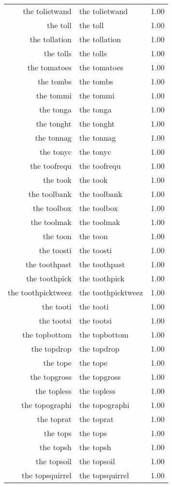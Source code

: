 \begin{table}[ht]
\begin{tabular}{rlr}
  the tolietwand & the tolietwand & 1.00 \\ 
  the toll & the toll & 1.00 \\ 
  the tollation & the tollation & 1.00 \\ 
  the tolls & the tolls & 1.00 \\ 
  the tomatoes & the tomatoes & 1.00 \\ 
  the tombs & the tombs & 1.00 \\ 
  the tommi & the tommi & 1.00 \\ 
  the tonga & the tonga & 1.00 \\ 
  the tonght & the tonght & 1.00 \\ 
  the tonnag & the tonnag & 1.00 \\ 
  the tonyc & the tonyc & 1.00 \\ 
  the toofrequ & the toofrequ & 1.00 \\ 
  the took & the took & 1.00 \\ 
  the toolbank & the toolbank & 1.00 \\ 
  the toolbox & the toolbox & 1.00 \\ 
  the toolmak & the toolmak & 1.00 \\ 
  the toon & the toon & 1.00 \\ 
  the toosti & the toosti & 1.00 \\ 
  the toothpast & the toothpast & 1.00 \\ 
  the toothpick & the toothpick & 1.00 \\ 
  the toothpicktweez & the toothpicktweez & 1.00 \\ 
  the tooti & the tooti & 1.00 \\ 
  the tootsi & the tootsi & 1.00 \\ 
  the topbottom & the topbottom & 1.00 \\ 
  the topdrop & the topdrop & 1.00 \\ 
  the tope & the tope & 1.00 \\ 
  the topgross & the topgross & 1.00 \\ 
  the topless & the topless & 1.00 \\ 
  the topographi & the topographi & 1.00 \\ 
  the toprat & the toprat & 1.00 \\ 
  the tops & the tops & 1.00 \\ 
  the topsh & the topsh & 1.00 \\ 
  the topsoil & the topsoil & 1.00 \\ 
  the topsquirrel & the topsquirrel & 1.00 \\ 

\end{tabular}
\end{table}

